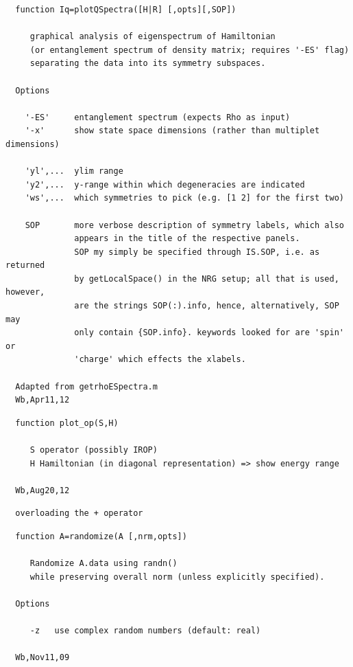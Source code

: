 \documentclass[twoside,12pt]{article}
\begin{document}
\pagebreak[3]



\begin{verbatim}
  function Iq=plotQSpectra([H|R] [,opts][,SOP])
 
     graphical analysis of eigenspectrum of Hamiltonian
     (or entanglement spectrum of density matrix; requires '-ES' flag)
     separating the data into its symmetry subspaces.
 
  Options
 
    '-ES'     entanglement spectrum (expects Rho as input)
    '-x'      show state space dimensions (rather than multiplet dimensions)
 
    'yl',...  ylim range
    'y2',...  y-range within which degeneracies are indicated
    'ws',...  which symmetries to pick (e.g. [1 2] for the first two)
 
    SOP       more verbose description of symmetry labels, which also
              appears in the title of the respective panels.
              SOP my simply be specified through IS.SOP, i.e. as returned
              by getLocalSpace() in the NRG setup; all that is used, however,
              are the strings SOP(:).info, hence, alternatively, SOP may
              only contain {SOP.info}. keywords looked for are 'spin' or
              'charge' which effects the xlabels.
 
  Adapted from getrhoESpectra.m
  Wb,Apr11,12
\end{verbatim}

\pagebreak[3]



\begin{verbatim}
  function plot_op(S,H)
 
     S operator (possibly IROP)
     H Hamiltonian (in diagonal representation) => show energy range
 
  Wb,Aug20,12
\end{verbatim}

\pagebreak[3]



\begin{verbatim}
  overloading the + operator
\end{verbatim}

\pagebreak[3]



\begin{verbatim}
  function A=randomize(A [,nrm,opts])
 
     Randomize A.data using randn()
     while preserving overall norm (unless explicitly specified).
 
  Options
 
     -z   use complex random numbers (default: real)
 
  Wb,Nov11,09
\end{verbatim}
\end{document}
